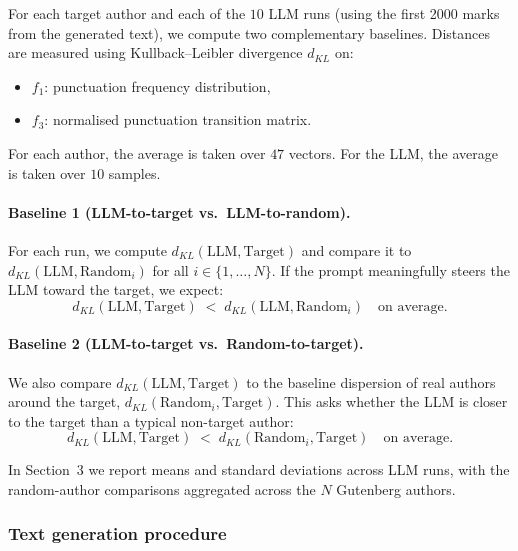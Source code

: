 \documentclass{article}
\begin{document}
For each target author and each of the $10$ LLM runs (using the first 2000 marks from the generated text), we compute two complementary baselines. Distances are measured using Kullback--Leibler divergence $d_{KL}$ on:



\begin{itemize}
    \item $f_1$: punctuation frequency distribution,
    \item $f_3$: normalised punctuation transition matrix.
\end{itemize}

For each author, the average is taken over $47$ vectors. For the LLM, the average is taken over $10$ samples. 

\paragraph{Baseline 1 (LLM-to-target vs.\ LLM-to-random).}
For each run, we compute $d_{KL}(\text{LLM}, \text{Target})$ and compare it to $d_{KL}(\text{LLM}, \text{Random}_i)$ for all $i \in \{1,\dots,N\}$. If the prompt meaningfully steers the LLM toward the target, we expect:
\[
d_{KL}(\text{LLM}, \text{Target}) \;<\; d_{KL}(\text{LLM}, \text{Random}_i)
\quad \text{on average.}
\]

\paragraph{Baseline 2 (LLM-to-target vs.\ Random-to-target).}
We also compare $d_{KL}(\text{LLM}, \text{Target})$ to the baseline dispersion of real authors around the target, $d_{KL}(\text{Random}_i, \text{Target})$. This asks whether the LLM is closer to the target than a typical non-target author:
\[
d_{KL}(\text{LLM}, \text{Target}) \;<\; d_{KL}(\text{Random}_i, \text{Target})
\quad \text{on average.}
\]

In Section~3 we report means and standard deviations across LLM runs, with the random-author comparisons aggregated across the $N$ Gutenberg authors.

\subsubsection{Text generation procedure}
\label{subsec:text_gen_procedure}
\end{document}
